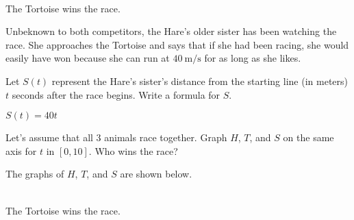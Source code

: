 \begin{problem}
\begin{subproblem}
\begin{shortsolution}
		\\
		The Tortoise wins the race.
	\end{shortsolution}
\end{subproblem}
Unbeknown to both competitors, the Hare's older sister has been watching the race.
She approaches the Tortoise and says that if she had been racing, she would easily have won
because she can run at $\SI{40}{\meter\per\second}$ for as long as she likes. 
\begin{subproblem}
	Let $S(t)$ represent the Hare's sister's distance from the starting line (in meters) $t$ seconds 
	after the race begins. Write a formula for $S$.
	\begin{shortsolution}
		$S(t)=40t$
	\end{shortsolution}
\end{subproblem}
\begin{subproblem}
	Let's assume that all 3 animals race together. Graph $H$, $T$, and $S$ on the same axis for $t$ in $[0,10]$. Who wins the race?
	\begin{shortsolution}
		The graphs of $H$, $T$, and $S$  are shown below.
																			
		\\
		The Tortoise wins the race.
	\end{shortsolution}
\end{subproblem}
\end{problem}
			
